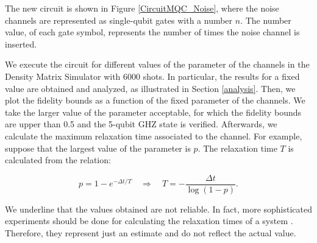 \vspace{0.2cm}

\noindent The new circuit is shown in Figure \ref{CircuitMQC_Noise}, where the noise channels are represented as single-qubit gates with a number $n$. The number value, of each gate symbol, represents the number of times the noise channel is inserted.

We execute the circuit for different values of the parameter of the channels in the Density Matrix Simulator with 6000 shots. In particular, the results for a fixed value are obtained and analyzed, as illustrated in Section \ref{analysis}. Then, we plot the fidelity bounds as a function of the fixed parameter of the channels. We take the larger value of the parameter acceptable, for which the fidelity bounds are upper than 0.5 and the 5-qubit GHZ state is verified. Afterwards, we calculate the maximum relaxation time associated to the channel. 
For example, suppose that the largest value of the parameter is $p$. The relaxation time $T$ is calculated from the relation:

\begin{equation}
p = 1 - e^{-\Delta t / T} \quad \Longrightarrow \quad T= -\frac{\Delta t}{\log{(1-p)}}.
 \label{RelaxationTimeFormula}
 \end{equation}

\noindent We underline that the values obtained are not reliable. In fact, more sophisticated experiments should be done for calculating the relaxation times of a system \cite{TutorialQiskit}. Therefore, they represent just an estimate and do not reflect the actual value.



